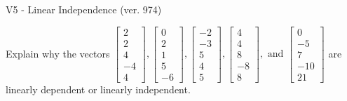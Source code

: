 \begin{exercise}
  \begin{exerciseTitle}V5 - Linear Independence (ver. 974)\end{exerciseTitle}
  \begin{exerciseStatement}
    Explain why the vectors \(\left[\begin{array}{r}
2 \\
2 \\
4 \\
-4 \\
4
\end{array}\right] , \left[\begin{array}{r}
0 \\
2 \\
1 \\
5 \\
-6
\end{array}\right] , \left[\begin{array}{r}
-2 \\
-3 \\
5 \\
4 \\
5
\end{array}\right] , \left[\begin{array}{r}
4 \\
4 \\
8 \\
-8 \\
8
\end{array}\right] , \text{ and } \left[\begin{array}{r}
0 \\
-5 \\
7 \\
-10 \\
21
\end{array}\right]\) are linearly dependent or linearly independent.	



\end{exerciseStatement}
\end{exercise}
